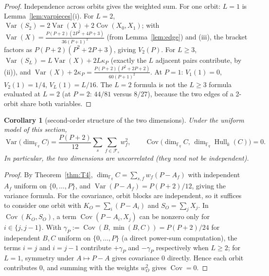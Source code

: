 \documentclass[10pt,journal,draftclsnofoot,onecolumn]{IEEEtran}
\newtheorem{corollary}[theorem]{Corollary}
\theoremstyle{definition}
\theoremstyle{remark}
\newcommand{\Fq}{\mathbb{F}_q}
\newcommand{\Hull}{\operatorname{Hull}}
\begin{document}
\begin{proof}
Independence across orbits gives the weighted sum. For one orbit:
\(L=1\) is Lemma~\ref{lem:varpieces}(i). For \(L=2\),
\(\operatorname{Var}(S_2) = 2\operatorname{Var}(X) + 2\operatorname{Cov}(X_0,X_1)\);
with \(\operatorname{Var}(X) = \frac{P(P+2)(2P^2+4P+3)}{36(P+1)^2}\)
(from Lemma~\ref{lem:edge}) and (iii), the bracket factors as
\(P(P+2)(P^2+2P+3)\), giving \(V_2(P)\). For \(L \ge 3\),
\(\operatorname{Var}(S_L) = L\operatorname{Var}(X) + 2L\kappa_P\) (exactly
the \(L\) adjacent pairs contribute, by (ii)), and
\(\operatorname{Var}(X) + 2\kappa_P =
\frac{P(P+2)(P^2+2P+2)}{60(P+1)^2}\). At \(P=1\): \(V_1(1) = 0\),
\(V_2(1) = 1/4\), \(V_L(1) = L/16\). The \(L=2\) formula is not the
\(L \ge 3\) formula evaluated at \(L=2\) (at \(P=2\): \(44/81\) versus
\(8/27\)), because the two edges of a 2-orbit share both variables.
\end{proof}

\begin{corollary}[second-order structure of the two dimensions]\label{cor:secondorder}
Under the uniform model of this section,
\[
\operatorname{Var}\big(\dim_{\Fq} C\big)
= \frac{P(P+2)}{12}\sum_s\sum_{f\in\mathcal{F}_s} w_f^2,
\qquad
\operatorname{Cov}\big(\dim_{\Fq} C,\,\dim_{\Fq}\Hull_k(C)\big)=0.
\]
In particular, the two dimensions are uncorrelated (they need not be
independent).
\end{corollary}

\begin{proof}
By Theorem~\ref{thm:T4},
\(\dim_{\Fq} C=\sum_{s,f} w_f(P-A_f)\) with independent \(A_f\) uniform
on \(\{0,\dots,P\}\), and
\(\operatorname{Var}(P-A_f)=P(P+2)/12\), giving the variance formula.
For the covariance, orbit blocks are independent, so it suffices to
consider one orbit with \(K_O=\sum_i(P-A_i)\) and \(S_O=\sum_j X_j\).
In \(\operatorname{Cov}(K_O,S_O)\), a term
\(\operatorname{Cov}(P-A_i,X_j)\) can be nonzero only for
\(i\in\{j,j-1\}\). With
\(\gamma_P:=\operatorname{Cov}(B,\min(B,C))=P(P+2)/24\) for independent
\(B,C\) uniform on \(\{0,\dots,P\}\) (a direct power-sum computation),
the terms \(i=j\) and \(i=j-1\) contribute \(+\gamma_P\) and
\(-\gamma_P\) respectively when \(L\ge2\); for \(L=1\), symmetry under
\(A\mapsto P-A\) gives covariance \(0\) directly. Hence each orbit
contributes \(0\), and summing with the weights \(w_O^2\) gives
\(\operatorname{Cov}=0\).
\end{proof}

\end{document}
